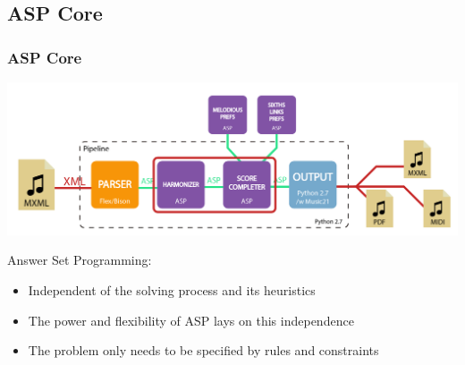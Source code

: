 \documentclass[english,fragile]{beamer}
\begin{document}
\subsection{ASP Core}
	\begin{frame}[t]
		\frametitle{ASP Core}
		\begin{center}
		\includegraphics[width=0.6\linewidth]{imagenes/arch_trans/arquitectura_final_asp_core-01.png}
		\end{center}
		Answer Set Programming:
		\begin{itemize}
			\item \alert{Independent} of the solving process and its heuristics
			\item The power and \alert{flexibility} of ASP lays on this independence
			\item The problem only needs to be specified by \alert{rules and constraints}
		\end{itemize}
\end{frame}
\end{document}
